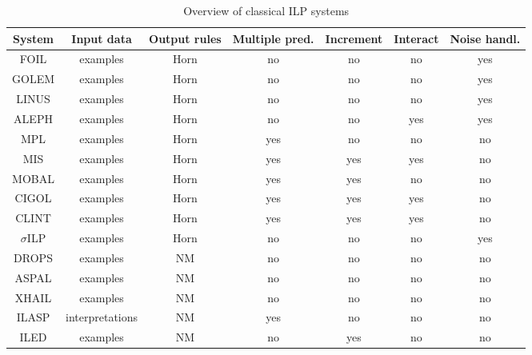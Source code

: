 \begin{table}[t]
\centering
\begin{tabular}{|c|c|c|c|c|c|c|}
\hline
System & Input data&Output rules & Multiple pred. &Increment & Interact &Noise handl.\\
\hline
FOIL \cite{foil} & examples&Horn& no &no & no  &yes \\
GOLEM \cite{golem} &examples&Horn&  no &no & no & yes \\
LINUS \cite{linus} &examples&Horn&  no& no & no & yes \\
ALEPH \cite{aleph} &examples&Horn&  no &no & yes & yes \\
MPL \cite{mpl} &examples&Horn&  yes &no & no & no \\
MIS \cite{mis} &examples&Horn&  yes &yes & yes & no \\
MOBAL \cite{mobal} &examples&Horn&  yes &yes & no & no \\
CIGOL \cite{cigol} &examples&Horn&  yes &yes & yes & no \\
CLINT \cite{clint} &examples&Horn&  yes &yes & yes & no \\
$\sigma$ILP \cite{sigmailp}&examples&Horn&no&no&no&yes\\
DROPS \cite{CorapiRL10}&examples&NM&no&no&no&no\\
ASPAL \cite{ASPAL}&examples&NM&no&no&no&no\\
XHAIL \cite{XHAIL}&examples&NM&no&no&no&no\\
ILASP \cite{ILASP_system}&interpretations&NM&yes&no&no&no\\
ILED \cite{ILED}&examples&NM&no&yes&no&no\\

\hline
\end{tabular}
\caption{Overview of classical ILP systems}
\label{tab:ilp}
\end{table}